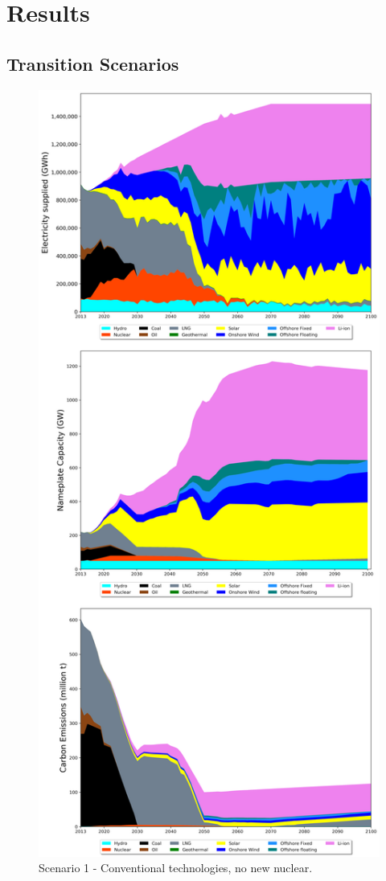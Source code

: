 \section{Results} \label{Results-and-discussion}

\subsection{Transition Scenarios}

\begin{figure}[H] 
\centering
\vspace*{-3cm}
\includegraphics[scale=0.42]{figures/conv_nonuc}
\caption{Scenario 1 - Conventional technologies, no new nuclear.}
\label{scen1}
\end{figure}

